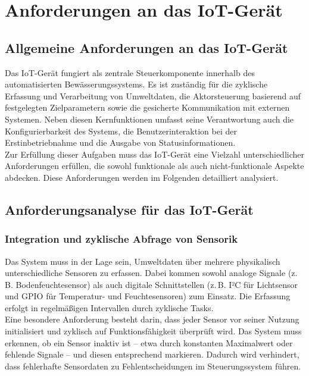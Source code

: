 \section{Anforderungen an das IoT-Gerät}
\label{sec:Anforderungen_IoT}
\subsection{Allgemeine Anforderungen an das IoT-Gerät}

Das IoT-Gerät fungiert als zentrale Steuerkomponente innerhalb des automatisierten Bewässerungssystems. Es ist zuständig für die zyklische Erfassung und Verarbeitung von Umweltdaten, die Aktorsteuerung basierend auf festgelegten Zielparametern sowie die gesicherte Kommunikation mit externen Systemen. Neben diesen Kernfunktionen umfasst seine Verantwortung auch die Konfigurierbarkeit des Systems, die Benutzerinteraktion bei der Erstinbetriebnahme und die Ausgabe von Statusinformationen.
\\
Zur Erfüllung dieser Aufgaben muss das IoT-Gerät eine Vielzahl unterschiedlicher Anforderungen erfüllen, die sowohl funktionale als auch nicht-funktionale Aspekte abdecken. Diese Anforderungen werden im Folgenden detailliert analysiert.

\subsection{Anforderungsanalyse für das IoT-Gerät}

\subsubsection{Integration und zyklische Abfrage von Sensorik}

Das System muss in der Lage sein, Umweltdaten über mehrere physikalisch unterschiedliche Sensoren zu erfassen. Dabei kommen sowohl analoge Signale (z.\,B. Bodenfeuchtesensor) als auch digitale Schnittstellen (z.\,B. I²C für Lichtsensor und GPIO für Temperatur- und Feuchtesensoren) zum Einsatz. Die Erfassung erfolgt in regelmäßigen Intervallen durch zyklische Tasks.
\\
Eine besondere Anforderung besteht darin, dass jeder Sensor vor seiner Nutzung initialisiert und zyklisch auf Funktionsfähigkeit überprüft wird. Das System muss erkennen, ob ein Sensor inaktiv ist – etwa durch konstanten Maximalwert oder fehlende Signale – und diesen entsprechend markieren. Dadurch wird verhindert, dass fehlerhafte Sensordaten zu Fehlentscheidungen im Steuerungssystem führen.

